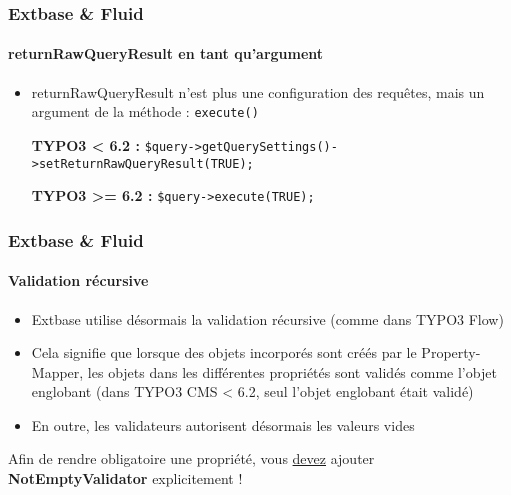 
\begin{frame}[fragile]
	\frametitle{Extbase \& Fluid}
	\framesubtitle{returnRawQueryResult en tant qu'argument}

	\lstset{
		basicstyle=\smaller\ttfamily
	}

	\begin{itemize}
		\item returnRawQueryResult n'est plus une configuration des requêtes,\newline
			mais un argument de la méthode : \texttt{execute()}
			\newline

			\smaller\textbf{TYPO3 < 6.2 :}\normalsize\newline
			\lstinline!$query->getQuerySettings()->setReturnRawQueryResult(TRUE);!
			\newline

			\smaller\textbf{TYPO3 >= 6.2 :}\normalsize\newline
			\lstinline!$query->execute(TRUE);!

	\end{itemize}

\end{frame}


\begin{frame}[fragile]
	\frametitle{Extbase \& Fluid}
	\framesubtitle{Validation récursive}

	\begin{itemize}
		\item Extbase utilise désormais la validation récursive (comme dans TYPO3 Flow)
		\item Cela signifie que lorsque des objets incorporés sont créés par le Property-Mapper,
			les objets dans les différentes propriétés sont validés comme l'objet englobant\newline
			(dans TYPO3 CMS < 6.2, seul l'objet englobant était validé)
		\item En outre, les validateurs autorisent désormais les valeurs vides
	\end{itemize}

	\breakingchange

	\smaller\begin{center} Afin de rendre obligatoire une propriété, vous \underline{devez} ajouter \textbf{NotEmptyValidator} explicitement !\end{center}\normalsize

\end{frame}


